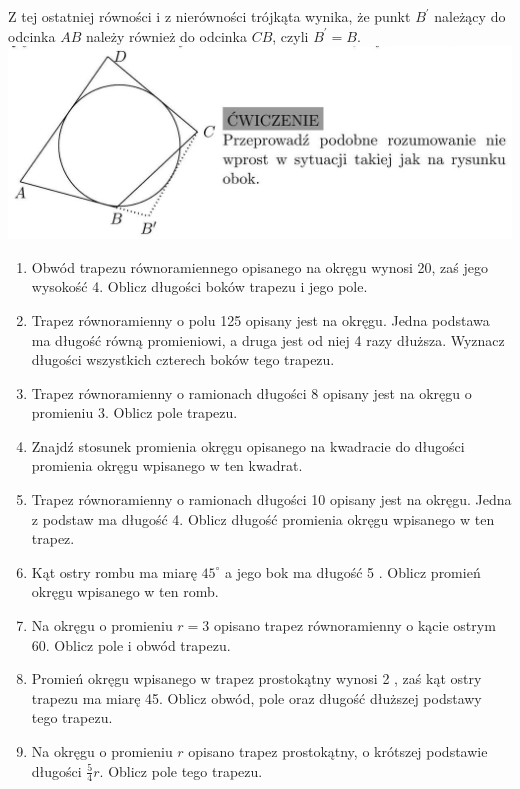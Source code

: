 \documentclass[10pt]{article}
\begin{document}
Z tej ostatniej równości i z nierówności trójkąta wynika, że punkt \(B^{\prime}\) należący do odcinka \(A B\) należy również do odcinka \(C B\), czyli \(B^{\prime}=B\).\\
\includegraphics[max width=\textwidth, center]{2024_11_21_e9b4faa005d5be2cc318g-050}

\begin{enumerate}
  \item Obwód trapezu równoramiennego opisanego na okręgu wynosi 20, zaś jego wysokość 4. Oblicz długości boków trapezu i jego pole.
  \item Trapez równoramienny o polu 125 opisany jest na okręgu. Jedna podstawa ma długość równą promieniowi, a druga jest od niej 4 razy dłuższa. Wyznacz długości wszystkich czterech boków tego trapezu.
  \item Trapez równoramienny o ramionach długości 8 opisany jest na okręgu o promieniu 3. Oblicz pole trapezu.
  \item Znajdź stosunek promienia okręgu opisanego na kwadracie do długości promienia okręgu wpisanego w ten kwadrat.
  \item Trapez równoramienny o ramionach długości 10 opisany jest na okręgu. Jedna z podstaw ma długość 4. Oblicz długość promienia okręgu wpisanego w ten trapez.
  \item Kąt ostry rombu ma miarę \(45^{\circ}\) a jego bok ma długość 5 . Oblicz promień okręgu wpisanego w ten romb.
  \item Na okręgu o promieniu \(r=3\) opisano trapez równoramienny o kącie ostrym 60. Oblicz pole i obwód trapezu.
  \item Promień okręgu wpisanego w trapez prostokątny wynosi 2 , zaś kąt ostry trapezu ma miarę 45. Oblicz obwód, pole oraz długość dłuższej podstawy tego trapezu.
  \item Na okręgu o promieniu \(r\) opisano trapez prostokątny, o krótszej podstawie długości \(\frac{5}{4} r\). Oblicz pole tego trapezu.\\

\end{enumerate}
\end{document}
